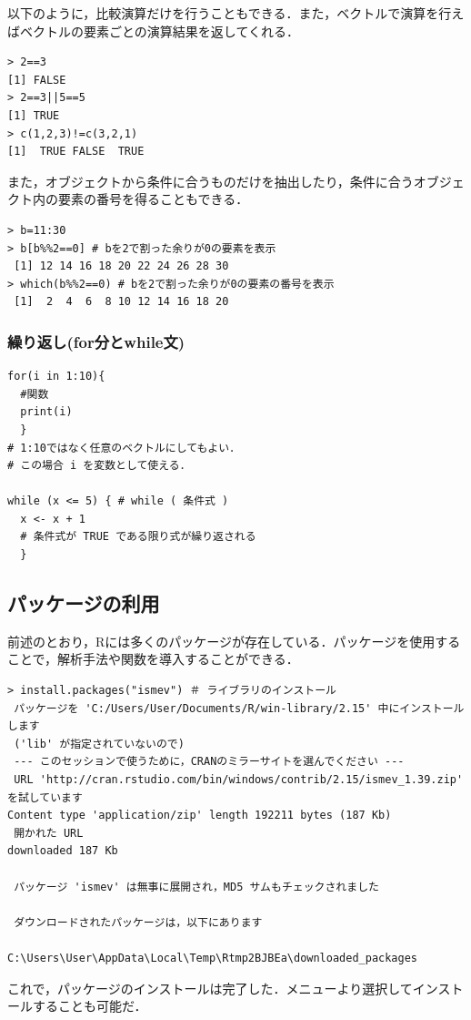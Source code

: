 以下のように，比較演算だけを行うこともできる．また，ベクトルで演算を行えばベクトルの要素ごとの演算結果を返してくれる．
\begin{breakbox}
\begin{verbatim}
> 2==3
[1] FALSE
> 2==3||5==5
[1] TRUE
> c(1,2,3)!=c(3,2,1)
[1]  TRUE FALSE  TRUE
\end{verbatim}
\end{breakbox}

また，オブジェクトから条件に合うものだけを抽出したり，条件に合うオブジェクト内の要素の番号を得ることもできる．
\begin{breakbox}
\begin{verbatim}
> b=11:30
> b[b%%2==0] # bを2で割った余りが0の要素を表示
 [1] 12 14 16 18 20 22 24 26 28 30
> which(b%%2==0) # bを2で割った余りが0の要素の番号を表示
 [1]  2  4  6  8 10 12 14 16 18 20
\end{verbatim}
\end{breakbox}
\subsubsection{繰り返し(for分とwhile文)}
\begin{screen}
\begin{verbatim}
for(i in 1:10){
  #関数
  print(i)
  }
# 1:10ではなく任意のベクトルにしてもよい．
# この場合 i を変数として使える．

while (x <= 5) { # while ( 条件式 )
  x <- x + 1
  # 条件式が TRUE である限り式が繰り返される
  } 

\end{verbatim}
\end{screen}
\subsection{パッケージの利用}
前述のとおり，Rには多くのパッケージが存在している．パッケージを使用することで，解析手法や関数を導入することができる．
\begin{breakbox}
\begin{verbatim}
> install.packages("ismev") ＃ ライブラリのインストール
 パッケージを 'C:/Users/User/Documents/R/win-library/2.15' 中にインストールします 
 ('lib' が指定されていないので) 
 --- このセッションで使うために，CRANのミラーサイトを選んでください --- 
 URL 'http://cran.rstudio.com/bin/windows/contrib/2.15/ismev_1.39.zip' を試しています 
Content type 'application/zip' length 192211 bytes (187 Kb)
 開かれた URL 
downloaded 187 Kb

 パッケージ 'ismev' は無事に展開され，MD5 サムもチェックされました 

 ダウンロードされたパッケージは，以下にあります 
        C:\Users\User\AppData\Local\Temp\Rtmp2BJBEa\downloaded_packages 
\end{verbatim}
\end{breakbox}
これで，パッケージのインストールは完了した．メニューより選択してインストールすることも可能だ．

